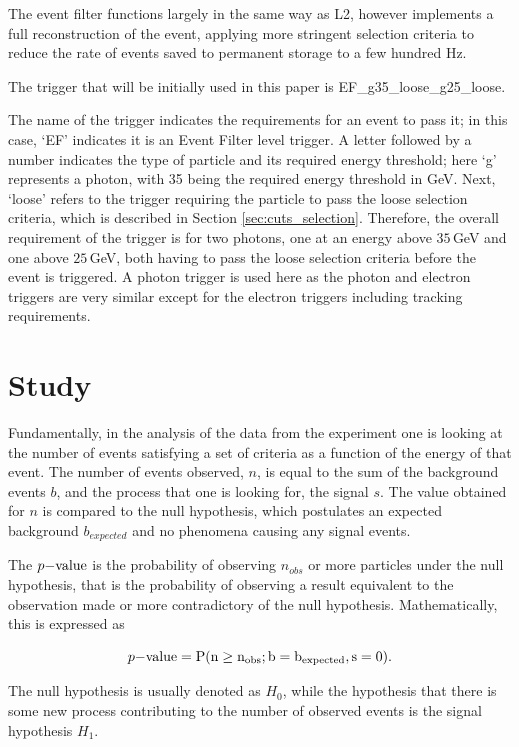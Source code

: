 \documentclass{article}
\begin{document}
The event filter functions largely in the same way as L2, however implements a full reconstruction of the event, applying more stringent selection criteria to reduce the rate of events saved to permanent storage to a few hundred Hz.

The trigger that will be initially used in this paper is  EF\_g35\_loose\_g25\_loose.

The name of the trigger indicates the requirements for an event to pass it; in this case, `EF' indicates it is an Event Filter level trigger. A letter followed by a number indicates the type of particle and its required energy threshold; here `g' represents a photon, with 35  being the required energy threshold in GeV. Next, `loose' refers to the trigger requiring the particle to pass the loose selection criteria, which is described in Section \ref{sec:cuts_selection}. Therefore, the overall requirement of the trigger is for two photons, one at an energy above $35\,$GeV and one above $25\,$GeV, both having to pass the loose selection criteria before the event is triggered. A photon trigger is used here as the photon and electron triggers are very similar except for the electron triggers including tracking requirements.

\section{Study}
\label{sec:Study}

Fundamentally, in the analysis of the data from the experiment one is looking at the number of events satisfying a set of criteria as a function of the energy of that event. The number of events observed, $n$, is equal to the sum of the background events $b$, and the process that one is looking for, the signal $s$. The value obtained for $n$ is compared to the null hypothesis, which postulates an expected background $b_{expected}$ and no phenomena causing any signal events.

The $p\rm{-value}$ is the probability of observing $n_{obs}$ or more particles under the null hypothesis, that is the probability of observing a result equivalent to the observation made or more contradictory of the null hypothesis. Mathematically, this is expressed as

\begin{equation}
p\rm{-value} = P(n	\geq n_{obs}; b = b_{expected}, s=0).
\end{equation}

The null hypothesis is usually denoted as $H_0$, while the hypothesis that there is some new process contributing to the number of observed events is the signal hypothesis $H_1$.
\end{document}
